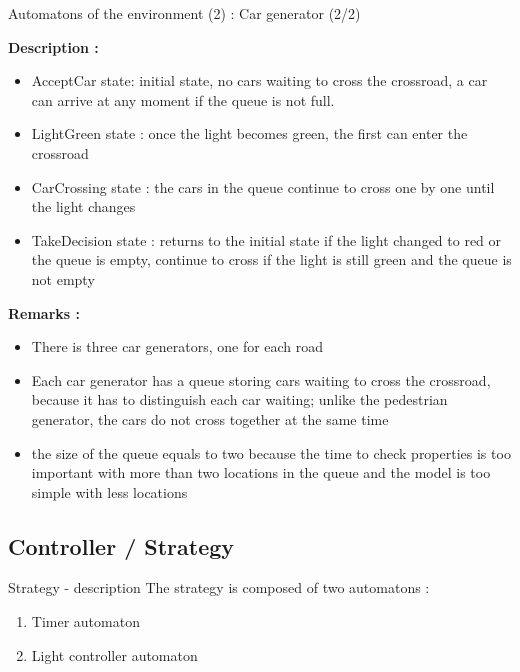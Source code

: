 \documentclass{bredelebeamer}
\begin{document}
\begin{frame}{Automatons of the environment (2) : Car generator (2/2)}



\textbf{Description : }


\begin{itemize}

\item AcceptCar state: initial state, no cars waiting to cross the crossroad, a car can arrive at any moment if the queue is not full.

\item LightGreen state : once the light becomes green, the first can enter the crossroad

\item CarCrossing state : the cars in the queue continue to cross one by one until the light changes

\item TakeDecision state : returns to the initial state if the light changed to red or the queue is empty, continue to cross if the light is still green and the queue is not empty

\end{itemize}


\textbf{Remarks : }


\begin{itemize}

\item There is three car generators, one for each road

\item Each car generator has a queue storing cars waiting to cross the crossroad, because it has to distinguish each car waiting; unlike the pedestrian generator, the cars do not cross together at the same time

\item the size of the queue equals to two because the time to check properties is too important with more than two locations in the queue and the model is too simple with less locations

\end{itemize}


\end{frame}

\subsection{Controller / Strategy}
\begin{frame}{Strategy - description}
The strategy is composed of two automatons :
\begin{enumerate}
\item <1-> Timer automaton
\item <2-> Light controller automaton
\end{enumerate}
\end{frame}
\end{document}
